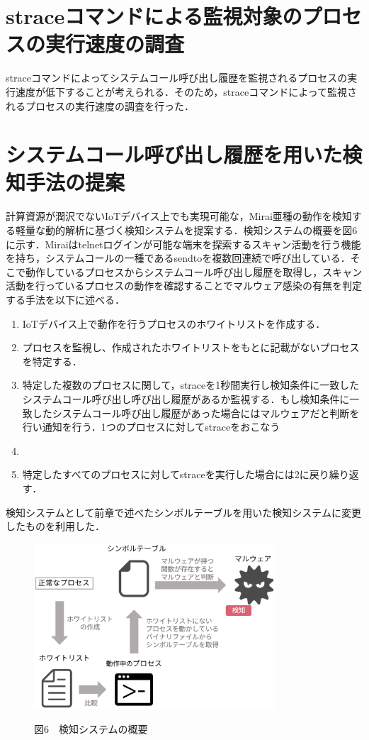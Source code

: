 \section{straceコマンドによる監視対象のプロセスの実行速度の調査}
straceコマンドによってシステムコール呼び出し履歴を監視されるプロセスの実行速度が低下することが考えられる．そのため，straceコマンドによって監視されるプロセスの実行速度の調査を行った．


\section{システムコール呼び出し履歴を用いた検知手法の提案}
計算資源が潤沢でないIoTデバイス上でも実現可能な，Mirai亜種の動作を検知する軽量な動的解析に基づく検知システムを提案する．検知システムの概要を図6に示す．Miraiはtelnetログインが可能な端末を探索するスキャン活動を行う機能を持ち，システムコールの一種であるsendtoを複数回連続で呼び出している．そこで動作しているプロセスからシステムコール呼び出し履歴を取得し，スキャン活動を行っているプロセスの動作を確認することでマルウェア感染の有無を判定する手法を以下に述べる．

\begin{enumerate}
 \item IoTデバイス上で動作を行うプロセスのホワイトリストを作成する．
 \item プロセスを監視し、作成されたホワイトリストをもとに記載がないプロセスを特定する．
 \item 特定した複数のプロセスに関して，straceを1秒間実行し検知条件に一致したシステムコール呼び出し呼び出し履歴があるか監視する．もし検知条件に一致したシステムコール呼び出し履歴があった場合にはマルウェアだと判断を行い通知を行う．1つのプロセスに対してstraceをおこなう
 
 \item 
 
 \item 特定したすべてのプロセスに対してstraceを実行した場合には2に戻り繰り返す．
 \end{enumerate}
 
 検知システムとして前章で述べたシンボルテーブルを用いた検知システムに変更したものを利用した．
 
 \begin{figure}[h]
 \centering
    \includegraphics[width=90mm]{figures/system.eps}
 \label{fig:model}
 \begin{center}図6　検知システムの概要\end{center}
 \end{figure}
 


